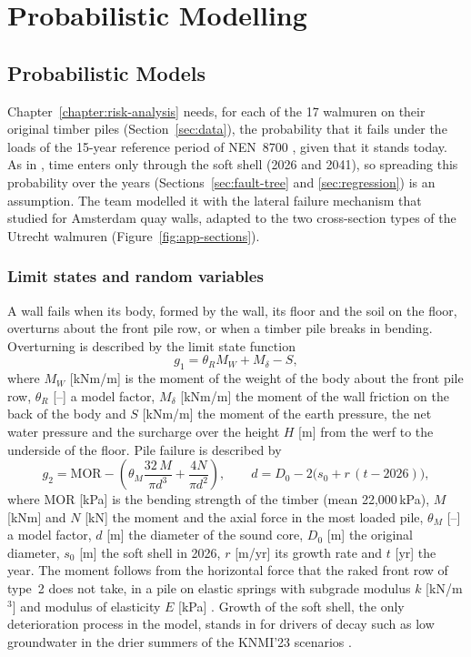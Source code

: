 \chapter{Probabilistic Modelling}
\label{chapter:probabilistic-modelling}

\section{Probabilistic Models}\label{sec:prob}

Chapter~\ref{chapter:risk-analysis} needs, for each of the 17 walmuren on
their original timber piles (Section~\ref{sec:data}), the probability that it
fails under the loads of the 15-year reference period of NEN~8700
\parencite{nen8700}, given that it stands today. As in \textcite{hemel2024},
time enters only through the soft shell (2026 and 2041), so spreading this
probability over the years (Sections~\ref{sec:fault-tree} and
\ref{sec:regression}) is an assumption. The team modelled it with the lateral failure mechanism that
\textcite{hemel2023,hemel2024} studied for Amsterdam quay walls, adapted to the
two cross-section types of the Utrecht walmuren \parencite{ibu2010,erfgoed156}
(Figure~\ref{fig:app-sections}).

\subsection{Limit states and random variables}\label{sec:prob-ls}

A wall fails when its body, formed by the wall, its floor and the soil on the
floor, overturns about the front pile row, or when a timber pile breaks in
bending. Overturning is described by the limit state function
\begin{equation}
g_1 = \theta_R M_W + M_\delta - S, \label{eq:g1}
\end{equation}
where $M_W$ [kNm/m] is the moment of the weight of the body about the front
pile row, $\theta_R$ [--] a model factor, $M_\delta$ [kNm/m] the moment of the
wall friction on the back of the body and $S$ [kNm/m] the moment of the earth
pressure, the net water pressure and the surcharge over the height $H$ [m]
from the werf to the underside of the floor. Pile failure is described by
\begin{equation}
g_2 = \mathrm{MOR} - \left(\theta_M \frac{32\,M}{\pi d^3} + \frac{4N}{\pi d^2}\right),
\qquad d = D_0 - 2\bigl(s_0 + r\,(t - 2026)\bigr), \label{eq:g2}
\end{equation}
where MOR [kPa] is the bending strength of the timber (mean 22{,}000\,kPa), $M$ [kNm] and $N$ [kN]
the moment and the axial force in the most loaded pile, $\theta_M$ [--] a
model factor, $d$ [m] the diameter of the sound core, $D_0$ [m] the original
diameter, $s_0$ [m] the soft shell in 2026, $r$ [m/yr] its growth rate and $t$
[yr] the year. The moment follows from the horizontal force that the raked
front row of type~2 does not take, in a pile on elastic springs with subgrade
modulus $k$ [kN/m$^3$] and modulus of elasticity $E$ [kPa] \parencite{hemel2023,hetenyi1946}.
Growth of the soft shell, the only deterioration process in the model, stands
in for drivers of decay such as low groundwater in the drier summers of the
KNMI'23 scenarios \parencite{knmi2023}.

